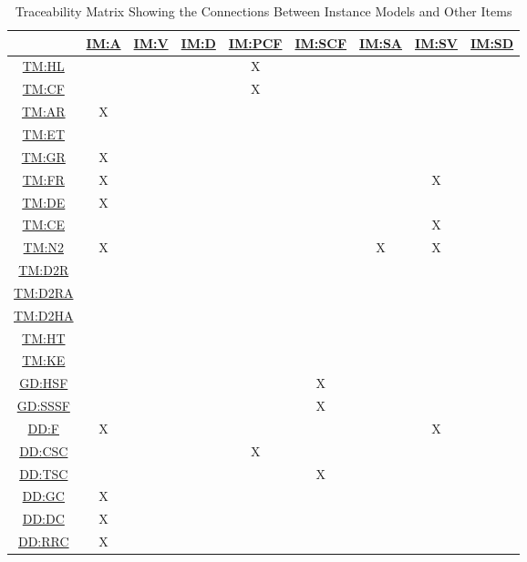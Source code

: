 \documentclass[12pt]{article}
\newcommand{\hpref}[1]{\hyperref[#1]{#1}}
\begin{document}
\begin{table}[H]
\centering
\begin{tabular}{|c|c|c|c|c|c|c|c|c|}
\hline
	& \hpref{IM:A} & \hpref{IM:V}& \hpref{IM:D} & \hpref{IM:PCF} & \hpref{IM:SCF} & \hpref{IM:SA}& \hpref{IM:SV}& \hpref{IM:SD}\\
\hline
\hpref{TM:HL}        & & & &X& & & &  \\ \hline
\hpref{TM:CF}        & & & &X& & & &  \\ \hline
\hpref{TM:AR}        &X& & & & & & &  \\ \hline
\hpref{TM:ET}        & & & & & & & &  \\ \hline
\hpref{TM:GR}        &X& & & & & & &  \\ \hline
\hpref{TM:FR}        &X& & & & & &X&  \\ \hline
\hpref{TM:DE}        &X& & & & & & &  \\ \hline
\hpref{TM:CE}        & & & & & & &X&  \\ \hline
\hpref{TM:N2}        &X& & & & &X&X&  \\ \hline
\hpref{TM:D2R}       & & & & & & & &  \\ \hline
\hpref{TM:D2RA}      & & & & & & & &  \\ \hline
\hpref{TM:D2HA}      & & & & & & & &  \\ \hline
\hpref{TM:HT}        & & & & & & & &  \\ \hline
\hpref{TM:KE}        & & & & & & & &  \\ \hline
\hpref{GD:HSF}         & & & & &X& & &  \\ \hline
\hpref{GD:SSSF}         & & & & &X& & &  \\ \hline
\hpref{DD:F}        &X& & & & & &X&  \\ \hline
\hpref{DD:CSC}        & & & &X& & & &  \\ \hline
\hpref{DD:TSC}        & & & & &X& & &  \\ \hline
\hpref{DD:GC}        &X& & & & & & &  \\ \hline
\hpref{DD:DC}        &X& & & & & & &  \\ \hline
\hpref{DD:RRC}        &X& & & & & & &  \\ \hline
\end{tabular}
\caption{Traceability Matrix Showing the Connections Between Instance Models and Other Items}
\label{Table:trace_IM_Others}
\end{table}
\end{document}
